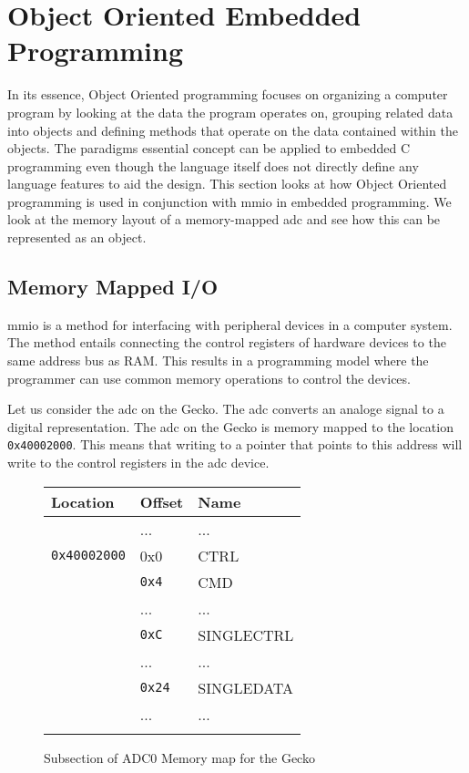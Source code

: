 \section{Object Oriented Embedded Programming}
\label{sec:back:oo}

In its essence, Object Oriented programming focuses on organizing a computer program by looking at the data the program operates on, grouping related data into objects and defining methods that operate on the data contained within the objects.
The paradigms essential concept can be applied to embedded C programming even though the language itself does not directly define any language features to aid the design.
This section looks at how Object Oriented programming is used in conjunction with \gls{mmio} in embedded programming.
We look at the memory layout of a memory-mapped \gls{adc} and see how this can be represented as an object.

\subsection{Memory Mapped I/O}
\gls{mmio} is a method for interfacing with peripheral devices in a computer system.
The method entails connecting the control registers of hardware devices to the same address bus as RAM.
This results in a programming model where the programmer can use common memory operations to control the devices.

Let us consider the \gls{adc} on the Gecko.
The \gls{adc} converts an analoge signal to a digital representation.
The \gls{adc} on the Gecko is memory mapped to the location \texttt{0x40002000}.
This means that writing to a pointer that points to this address will write to the control registers in the \gls{adc} device.

\begin{figure}[H]
  \centering
  \begin{tabular}{l|l|l|}
    \textbf{Location} & \textbf{Offset} & \textbf{Name} \\
    \hline
    &...&...\\
    \hline
    \hline
    \texttt{0x40002000} & 0x0 & CTRL\\
    \hline
    & \texttt{0x4} & CMD\\
    \hline
    &...&...\\
    \hline
    & \texttt{0xC} & SINGLECTRL\\
    \hline
    &...&...\\
    \hline
    & \texttt{0x24} & SINGLEDATA\\
    \hline
    &...&...\\
    \hline
    \hline
    &&\\
  \end{tabular}
  \caption{Subsection of ADC0 Memory map for the Gecko}
  \label{fig:back:memorymapped}
\end{figure}

